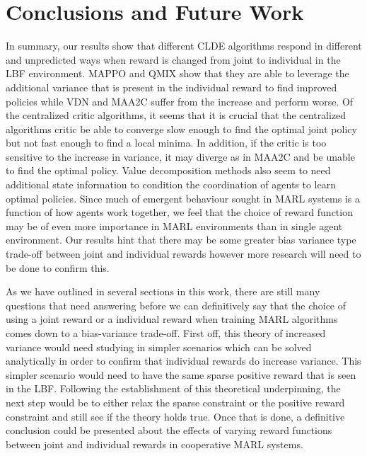 \documentclass[systems,article,submit,pdftex,moreauthors]{Definitions/mdpi}
\begin{document}
\section{Conclusions and Future Work}
In summary, our results show that different CLDE algorithms respond in different and unpredicted ways when reward is changed from joint to individual in the LBF environment. MAPPO and QMIX show that they are able to leverage the additional variance that is present in the individual reward to find improved policies while VDN and MAA2C suffer from the increase and perform worse. Of the centralized critic algorithms, it seems that it is crucial that the centralized algorithms critic be able to converge slow enough to find the optimal joint policy but not fast enough to find a local minima. In addition, if the critic is too sensitive to the increase in variance, it may diverge as in MAA2C and be unable to find the optimal policy. Value decomposition methods also seem to need additional state information to condition the coordination of agents to learn optimal policies. 
Since much of emergent behaviour sought in MARL systems is a function of how agents work together, we feel that the choice of reward function may be of even more importance in MARL environments than in single agent environment. Our results hint that there may be some greater bias variance type trade-off between joint and individual rewards however more research will need to be done to confirm this. 

As we have outlined in several sections in this work, there are still many questions that need answering before we can definitively say that the choice of using a joint reward or a individual reward when training MARL algorithms comes down to a bias-variance trade-off. First off, this theory of increased variance would need studying in simpler scenarios which can be solved analytically in order to confirm that individual rewards do increase variance. This simpler scenario would need to have the same sparse positive reward that is seen in the LBF. Following the establishment of this theoretical underpinning, the next step would be to either relax the sparse constraint or the positive reward constraint and still see if the theory holds true. Once that is done, a definitive conclusion could be presented about the effects of varying reward functions between joint and individual rewards in cooperative MARL systems. 


\end{document}
